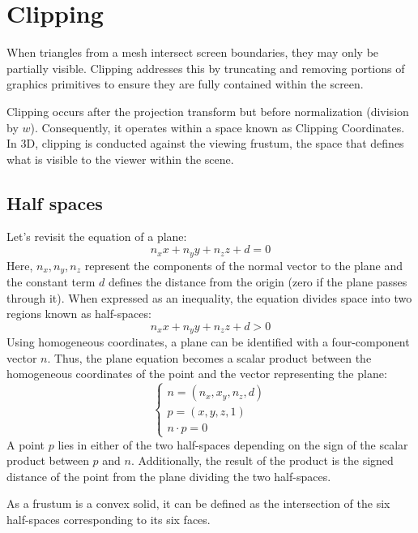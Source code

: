 \section{Clipping}

When triangles from a mesh intersect screen boundaries, they may only be partially visible. 
Clipping addresses this by truncating and removing portions of graphics primitives to ensure they are fully contained within the screen.

Clipping occurs after the projection transform but before normalization (division by $w$). 
Consequently, it operates within a space known as Clipping Coordinates.
In 3D, clipping is conducted against the viewing frustum, the space that defines what is visible to the viewer within the scene.

\subsection{Half spaces}
Let's revisit the equation of a plane:
\[n_xx+n_yy+n_zz+d=0\]
Here, $n_x, n_y,n_z$ represent the components of the normal vector to the plane and the constant term $d$ defines the distance from the origin (zero if the plane passes through it).
When expressed as an inequality, the equation divides space into two regions known as half-spaces:
\[n_xx+n_yy+n_zz+d>0\]
Using homogeneous coordinates, a plane can be identified with a four-component vector $n$. 
Thus, the plane equation becomes a scalar product between the homogeneous coordinates of the point and the vector representing the plane:
\[\begin{cases}
    n=\left(n_x,x_y,n_z,d\right) \\
    p=\left(x,y,z,1\right) \\
    n \cdot p = 0
\end{cases}\]
A point $p$ lies in either of the two half-spaces depending on the sign of the scalar product between $p$ and $n$. 
Additionally, the result of the product is the signed distance of the point from the plane dividing the two half-spaces.

As a frustum is a convex solid, it can be defined as the intersection of the six half-spaces corresponding to its six faces.

